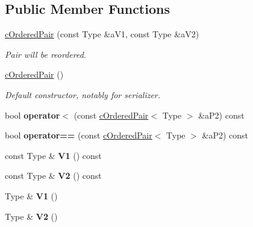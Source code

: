 \subsection*{Public Member Functions}
\begin{DoxyCompactItemize}
\item 
\hyperlink{classMMVII_1_1cOrderedPair_a6dad9976f4cd3aa4d2c2a32e8fd32a32}{c\+Ordered\+Pair} (const Type \&a\+V1, const Type \&a\+V2)\hypertarget{classMMVII_1_1cOrderedPair_a6dad9976f4cd3aa4d2c2a32e8fd32a32}{}\label{classMMVII_1_1cOrderedPair_a6dad9976f4cd3aa4d2c2a32e8fd32a32}

\begin{DoxyCompactList}\small\item\em Pair will be reordered. \end{DoxyCompactList}\item 
\hyperlink{classMMVII_1_1cOrderedPair_ac844ca368d54734d05dee483c1d41736}{c\+Ordered\+Pair} ()\hypertarget{classMMVII_1_1cOrderedPair_ac844ca368d54734d05dee483c1d41736}{}\label{classMMVII_1_1cOrderedPair_ac844ca368d54734d05dee483c1d41736}

\begin{DoxyCompactList}\small\item\em Default constructor, notably for serializer. \end{DoxyCompactList}\item 
bool {\bfseries operator$<$} (const \hyperlink{classMMVII_1_1cOrderedPair}{c\+Ordered\+Pair}$<$ Type $>$ \&a\+P2) const \hypertarget{classMMVII_1_1cOrderedPair_a203df54966a591062bfde6e5fc801e7c}{}\label{classMMVII_1_1cOrderedPair_a203df54966a591062bfde6e5fc801e7c}

\item 
bool {\bfseries operator==} (const \hyperlink{classMMVII_1_1cOrderedPair}{c\+Ordered\+Pair}$<$ Type $>$ \&a\+P2) const \hypertarget{classMMVII_1_1cOrderedPair_a7d8984db41f9dadbd283adb97dac6326}{}\label{classMMVII_1_1cOrderedPair_a7d8984db41f9dadbd283adb97dac6326}

\item 
const Type \& {\bfseries V1} () const \hypertarget{classMMVII_1_1cOrderedPair_a503fbc80109a88ed18ea9f8eb9d00b8f}{}\label{classMMVII_1_1cOrderedPair_a503fbc80109a88ed18ea9f8eb9d00b8f}

\item 
const Type \& {\bfseries V2} () const \hypertarget{classMMVII_1_1cOrderedPair_aba3807db6b8ec2e3a499b13f65e56028}{}\label{classMMVII_1_1cOrderedPair_aba3807db6b8ec2e3a499b13f65e56028}

\item 
Type \& {\bfseries V1} ()\hypertarget{classMMVII_1_1cOrderedPair_a8200a418ca342f53a8d59df227fdcab5}{}\label{classMMVII_1_1cOrderedPair_a8200a418ca342f53a8d59df227fdcab5}

\item 
Type \& {\bfseries V2} ()\hypertarget{classMMVII_1_1cOrderedPair_abf8c1f9dfa260b7d1663cf7b333c3875}{}\label{classMMVII_1_1cOrderedPair_abf8c1f9dfa260b7d1663cf7b333c3875}

\end{DoxyCompactItemize}
